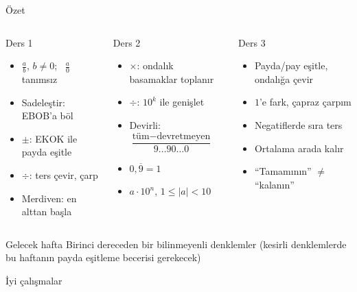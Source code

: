 \documentclass[aspectratio=169,11pt]{beamer}
\newcommand{\ab}[1]{\overline{#1}}
\begin{document}
\begin{frame}{Özet}
\small
\begin{columns}[t]
\begin{block}{Ders 1}
\begin{itemize}
\item \(\frac{a}{b}\), \(b\neq 0\); \ \(\frac{a}{0}\) tanımsız
\item Sadeleştir: EBOB'a böl
\item \(\pm\): EKOK ile payda eşitle
\item \(\div\): ters çevir, çarp
\item Merdiven: en alttan başla
\end{itemize}
\end{block}
\begin{block}{Ders 2}
\begin{itemize}
\item \(\times\): ondalık basamaklar toplanır
\item \(\div\): \(10^{k}\) ile genişlet
\item Devirli: \(\dfrac{\text{tüm}-\text{devretmeyen}}{9\ldots 90\ldots 0}\)
\item \(0{,}\ab{9}=1\)
\item \(a\cdot 10^{n}\), \(1\le|a|<10\)
\end{itemize}
\end{block}
\begin{block}{Ders 3}
\begin{itemize}
\item Payda/pay eşitle, ondalığa çevir
\item \(1\)'e fark, çapraz çarpım
\item Negatiflerde sıra ters
\item Ortalama arada kalır
\item ``Tamamının'' \(\neq\) ``kalanın''
\end{itemize}
\end{block}
\end{columns}
\vspace{2pt}
\begin{alertblock}{Gelecek hafta}
Birinci dereceden bir bilinmeyenli denklemler (kesirli denklemlerde bu haftanın payda eşitleme becerisi gerekecek)
\end{alertblock}
\end{frame}

\begin{frame}
\centering\Large İyi çalışmalar
\end{frame}
\end{document}
